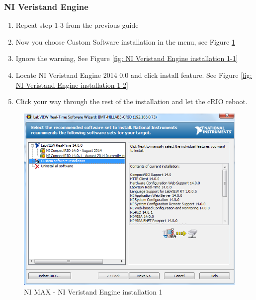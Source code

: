 \documentclass[a4paper,twoside,english]{report}
\begin{document}
\subsubsection{NI Veristand Engine}
\begin{enumerate}
\item Repeat step 1-3 from the previous guide
\item Now you choose Custom Software installation in the menu, see Figure
\ref{fig: NI Veristand Engine installation 1}
\item Ignore the warning, See Figure \ref{fig: NI Veristand Engine installation 1-1}
\item Locate NI Veristand Engine 2014 0.0 and click install feature. See
Figure \ref{fig: NI Veristand Engine installation 1-2}
\item Click your way through the rest of the installation and let the cRIO
reboot.
\end{enumerate}
\begin{figure}[!h]
\centering \includegraphics[scale=0.45]{Screenshots/Screenshot_2015-01-16_14-20-27.png}
\caption{NI MAX - NI Veristand Engine installation 1}

\label{fig: NI Veristand Engine installation 1} 
\end{figure}
\end{document}
